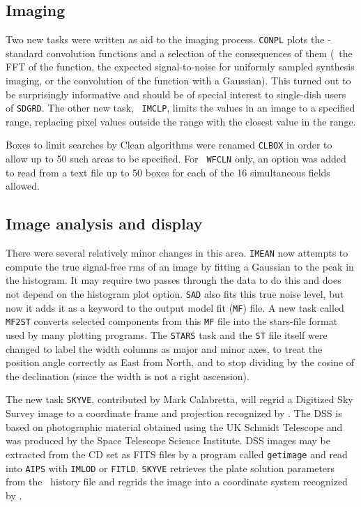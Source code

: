 \subsection{Imaging}

Two new tasks were written as aid to the imaging process.  {\tt CONPL}
plots the \AIPS-standard convolution functions and a selection of the
consequences of them (\ie\ the FFT of the function, the expected
signal-to-noise for uniformly sampled synthesis imaging, or the
convolution of the function with a Gaussian).  This turned out to be
surprisingly informative and should be of special interest to
single-dish users of \hbox{{\tt SDGRD}}.  The other new task, {\tt
IMCLP}, limits the values in an image to a specified range, replacing
pixel values outside the range with the closest value in the range.

Boxes to limit searches by Clean algorithms were renamed {\tt CLBOX}
in order to allow up to 50 such areas to be specified.  For {\tt
WFCLN} only, an option was added to read from a text file up to 50
boxes for each of the 16 simultaneous fields allowed.

\subsection{Image analysis and display}

There were several relatively minor changes in this area.  {\tt IMEAN}
now attempts to compute the true signal-free rms of an image by
fitting a Gaussian to the peak in the histogram.  It may require two
passes through the data to do this and does not depend on the
histogram plot option.  {\tt SAD} also fits this true noise level, but
now it adds it as a keyword to the output model fit ({\tt MF}) file.
A new task called {\tt MF2ST} converts selected components from this
{\tt MF} file into the stars-file format used by many plotting
programs.  The {\tt STARS} task and the {\tt ST} file itself were
changed to label the width columns as major and minor axes, to treat
the position angle correctly as East from North, and to stop dividing
by the cosine of the declination (since the width is not a right
ascension).

The new task {\tt SKYVE}, contributed by Mark Calabretta, will regrid
a Digitized Sky Survey image to a coordinate frame and projection
recognized by \hbox{\AIPS}.  The DSS is based on photographic material
obtained using the UK Schmidt Telescope and was produced by the Space
Telescope Science Institute.  DSS images may be extracted from the CD
set as FITS files by a program called {\tt getimage} and read into
{\tt AIPS} with {\tt IMLOD} or \hbox{{\tt FITLD}}.  {\tt SKYVE}
retrieves the plate solution parameters from the \AIPS\ history file
and regrids the image into a coordinate system recognized by
\hbox{\AIPS}.

